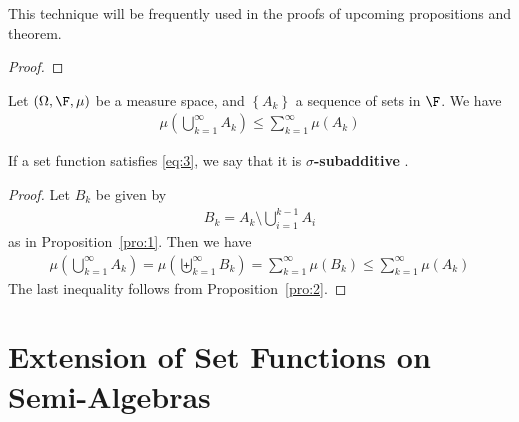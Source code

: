 \documentclass[thmcnt=section, 12pt]{elegantbook}
\begin{document}
\begin{remark}
    This technique will be frequently used in the proofs of upcoming propositions and theorem.
\end{remark}

\begin{proof}
\end{proof}


\begin{proposition}
    Let $(\Omega, \F, \mu)$ be a measure space, and $\left\{A_k\right\}$ a sequence of sets in $\F$. We have 
    \begin{align}
        \mu\left(\bigcup_{k=1}^\infty A_k\right)
        \leq \sum_{k=1}^\infty \mu(A_k)
        \label{eq:3}
    \end{align}
\end{proposition}

\begin{remark}
    If a set function satisfies \eqref{eq:3}, we say that it is \textbf{$\sigma$-subadditive} .
\end{remark}

\begin{proof}
    Let $B_k$ be given by 
    \begin{align*}
        B_k = A_k \setminus \bigcup_{i=1}^{k-1} A_i
    \end{align*}
    as in Proposition~\ref{pro:1}. Then we have 
    \begin{align*}
        \mu\left(\bigcup_{k=1}^\infty A_k\right)
        = \mu\left(\biguplus_{k=1}^\infty B_k\right)
        = \sum_{k=1}^\infty \mu(B_k)
        \leq \sum_{k=1}^\infty \mu(A_k)
    \end{align*}
    The last inequality follows from Proposition~\ref{pro:2}.
\end{proof}


\begin{proposition} \label{pro:3}
\end{proposition}


\section{Extension of Set Functions on Semi-Algebras}

\end{document}
